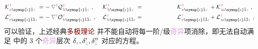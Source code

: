 \begin{subequations}
\begin{align}
	&{\mathcal{K}}^{\;\!\mathcolor{gray}{t}}_{\;\!\textcolor{Maroon}{\text{e}} \symup{\iota}\hat{1} \mathcolor{gray}{z}} \hspace{-1em}&&=\hspace{0.2em} &&\hspace{-1.1em}- \mathcolor{gray}{\nabla^t} {\mathcal{Q}}^{\;\!\mathcolor{gray}{t}}_{\;\!\textcolor{Maroon}{\text{b}} \symup{\iota}\hat{1} \mathcolor{gray}{z}}~, &&\hspace{0.3em} {\mathcal{K}}^{\;\!\mathcolor{gray}{t}}_{\;\!\textcolor{Maroon}{\text{b}} \symup{\iota}\hat{1} \mathcolor{gray}{z}} \hspace{-1em}&&=\hspace{0.2em} ~ \hphantom{- \epsilon^{\hphantom{\symup{\iota}\hat{1}}\hat{2}}_{\symup{\iota} \hat{1}}} {\mathcal{K}}^{\;\!\mathcolor{gray}{t}}_{\;\!\textcolor{Maroon}{\text{e}} \symup{\iota}\hat{1} \mathcolor{gray}{z}} &&\hspace{-1.1em}+ {\mathcal{K}}^{\;\!\mathcolor{gray}{t}}_{\;\!\textcolor{Maroon}{\text{m}} \symup{\iota}\hat{1} \mathcolor{gray}{z}}~, \label{eq:Ke-Kb} \\
	&{\mathcal{L}}^{\;\!\mathcolor{gray}{t}}_{\;\!\textcolor{Maroon}{\text{e}} \symup{\iota}\hat{1}\hat{3} \mathcolor{gray}{z}} \hspace{-1em}&&=\hspace{0.2em} &&\hspace{-1.1em}- \mathcolor{gray}{\nabla^t} {\mathcal{O}}^{\;\!\mathcolor{gray}{t}}_{\;\!\textcolor{Maroon}{\text{b}} \symup{\iota}\hat{1}\hat{3} \mathcolor{gray}{z}}~, &&\hspace{0.3em} {\mathcal{L}}^{\;\!\mathcolor{gray}{t}}_{\;\!\textcolor{Maroon}{\text{b}} \symup{\iota}\hat{1}\hat{3} \mathcolor{gray}{z}} \hspace{-1em}&&=\hspace{0.2em} ~ \hphantom{- \epsilon^{\hphantom{\symup{\iota}\hat{1}}\hat{2}}_{\symup{\iota} \hat{1}}} {\mathcal{L}}^{\;\!\mathcolor{gray}{t}}_{\;\!\textcolor{Maroon}{\text{e}} \symup{\iota}\hat{1}\hat{3} \mathcolor{gray}{z}} &&\hspace{-1.1em}+ {\mathcal{L}}^{\;\!\mathcolor{gray}{t}}_{\;\!\textcolor{Maroon}{\text{m}} \symup{\iota}\hat{1}\hat{3} \mathcolor{gray}{z}}~, \label{eq:Le-Lb}
\end{align}
\end{subequations}
可以验证，上述经典\textcolor{Maroon}{多极理论}  并不能自动将每一阶/级\textcolor{Plum}{奇异}项消除，即无法自动满足  中的 3 个\textcolor{Plum}{奇异}层次 ${\delta}_{\mathcolor{gray}{z}},{\delta}'_{\mathcolor{gray}{z}},{\delta}''_{\mathcolor{gray}{z}}$ 对应的方程。

